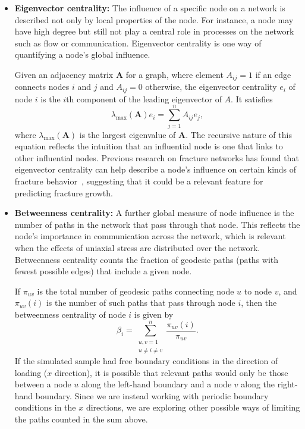 \begin{itemize}
    
    
    \item \textbf{Eigenvector centrality:} The influence of a specific node on a network is described not only by local properties of the node.  For instance, a node may have high degree but still not play a central role in processes on the network such as flow or communication.  Eigenvector centrality is one way of quantifying a node's global influence.
    
    Given an adjacency matrix $\mathbf{A}$ for a graph, where element $A_{ij}=1$ if an edge connects nodes $i$ and $j$ and $A_{ij}=0$ otherwise, the eigenvector centrality $e_i$ of node $i$ is the $i$th component of the leading eigenvector of $A$.  It satisfies
    \begin{equation}
    \lambda_{\max}(\mathbf{A}) e_i = \sum_{j=1}^n A_{ij}e_j,
    \end{equation}
    where $\lambda_{\max}(\mathbf{A})$ is the largest eigenvalue of $\mathbf{A}$.  The recursive nature of this equation reflects the intuition that an influential node is one that links to other influential nodes.  Previous research on fracture networks has found that eigenvector centrality can help describe a node's influence on certain kinds of fracture behavior~\cite{santiago2016,valera2018machine}, suggesting that it could be a relevant feature for predicting fracture growth.
    
    \item\textbf{Betweenness centrality:} A further global measure of node influence is the number of paths in the network that pass through that node.  This reflects the node's importance in communication across the network, which is relevant when the effects of uniaxial stress are distributed over the network.  Betweenness centrality counts the fraction of geodesic paths (paths with fewest possible edges) that include a given node.
    
    If $\pi_{uv}$ is the total number of geodesic paths connecting node $u$ to node $v$, and $\pi_{uv}(i)$ is the number of such paths that pass through node $i$, then the betweenness centrality of node $i$ is given by
    \begin{equation}
    \beta_i = \sum_{\substack{u,v = 1 \\ u\neq i\neq v }}^n \frac{\pi_{uv}(i)}{\pi_{uv}}.
    \end{equation}
    If the simulated sample had free boundary conditions in the direction of loading ($x$ direction), it is possible that relevant paths would only be those between a node $u$ along the left-hand boundary and a node $v$ along the right-hand boundary.  Since we are instead working with periodic boundary conditions in the $x$ directions, we are exploring other possible ways of limiting the paths counted in the sum above.
\end{itemize}

